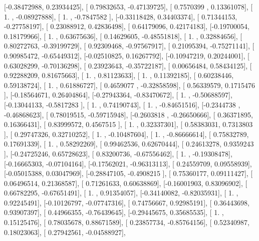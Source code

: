 \documentclass{article}
\begin{document}
       [-0.38472988,  0.23934425],
       [ 0.79832653, -0.47139725],
       [ 0.7570399 ,  0.13361078],
       [ 1.        , -0.08927888],
       [ 1.        , -0.7847582 ],
       [-0.33118428,  0.34403374],
       [ 0.71344153, -0.27758197],
       [ 0.23088912,  0.42836498],
       [ 0.64179096,  0.42174183],
       [-0.19700054,  0.18179966],
       [ 1.        ,  0.63675636],
       [ 0.14629605, -0.48551818],
       [ 1.        ,  0.32884656],
       [ 0.80272763, -0.39199729],
       [ 0.92309468, -0.97567917],
       [ 0.21095394, -0.75271141],
       [ 0.90985472, -0.65449312],
       [-0.02510825,  0.16267792],
       [-0.10947219,  0.20244001],
       [ 0.63028299, -0.70136298],
       [ 0.23923643, -0.35722187],
       [ 0.00656484,  0.58434125],
       [ 0.92288209,  0.81675663],
       [ 1.        ,  0.81123633],
       [ 1.        ,  0.11392185],
       [ 0.60238446,  0.59138724],
       [ 1.        ,  0.61886727],
       [ 0.4659077 , -0.32858598],
       [ 0.56339579,  0.1715476 ],
       [-0.18564671,  0.26404864],
       [-0.27943364, -0.83470672],
       [ 1.        , -0.50688597],
       [-0.13044133, -0.5817283 ],
       [ 1.        ,  0.74190743],
       [ 1.        , -0.84651516],
       [-0.2344738 , -0.46868623],
       [ 0.78019515, -0.59715948],
       [-0.2603818 , -0.26650666],
       [ 0.36371895,  0.16366431],
       [ 0.83999572,  0.4567515 ],
       [ 1.        ,  0.32337301],
       [ 0.58383031,  0.7313803 ],
       [ 0.29747326,  0.32710252],
       [ 1.        , -0.10487604],
       [ 1.        , -0.86666614],
       [ 0.75832789,  0.17691339],
       [ 1.        ,  0.58292269],
       [ 0.99462536,  0.62670444],
       [ 0.24613278,  0.9359243 ],
       [-0.24725246,  0.65728623],
       [ 0.83200736, -0.67556462],
       [ 1.        , -0.19308478],
       [-0.16665303, -0.07104164],
       [-0.17562021, -0.96313113],
       [ 0.24559709,  0.09558939],
       [-0.05015388,  0.03047969],
       [-0.28847105, -0.4908215 ],
       [ 0.75360177,  0.09111427],
       [ 0.06496514,  0.21368587],
       [ 0.71261633,  0.60638869],
       [-0.16001903,  0.83096902],
       [ 0.66782295, -0.67651491],
       [ 1.        ,  0.91354057],
       [-0.34140082, -0.82035931],
       [ 1.        ,  0.92245491],
       [-0.10126797, -0.07747316],
       [ 0.74756667,  0.92985191],
       [ 0.36443698,  0.93907397],
       [ 0.44966355, -0.76439645],
       [-0.29445675,  0.35685535],
       [ 1.        ,  0.15125476],
       [ 0.78035678,  0.88671589],
       [ 0.23857734, -0.85764156],
       [ 0.52340987,  0.18023063],
       [ 0.27942561, -0.04588927],
\end{document}
